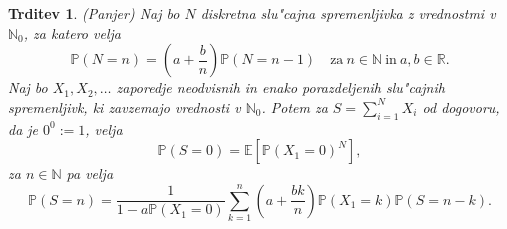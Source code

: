 \documentclass[12pt, a4paper, reqno]{amsart}
\theoremstyle{definition}
\theoremstyle{plain}
\newtheorem{trditev}[definicija]{Trditev}
\newcommand{\R}{\mathbb{R}}
\newcommand{\N}{\mathbb{N}}
\newcommand{\E}{\mathbb{E}}
\newcommand{\Prob}{\mathbb{P}}
\newcommand{\1}{\mathds{1}}
\begin{document}
    \begin{trditev}(Panjer)
        Naj bo $N$ diskretna slu"cajna spremenljivka z vrednostmi v $\N_0$, za katero velja 
        \begin{equation*}
            \Prob(N = n) = \left(a + \frac{b}{n}\right)\Prob\left(N = n-1\right) \quad \text{za} \ n\in\N \ \text{in} \ a, b \in \R.
        \end{equation*}
        Naj bo $X_1, X_2, \dots$ zaporedje neodvisnih in enako porazdeljenih slu"cajnih spremenljivk, ki 
        zavzemajo vrednosti v $\N_0$. Potem za $S = \sum_{i=1}^NX_i$ od dogovoru, da je $0^0:=1$, velja
        \begin{equation*}
        \Prob\left(S = 0\right) =  \E\left[\Prob\left(X_1 = 0\right)^N\right],
        \end{equation*}
        za $n\in\N$ pa velja
        \begin{equation}
            \Prob\left(S = n\right) = \frac{1}{1 - a\Prob\left(X_1 = 0\right)}\sum_{k = 1}^n\left(a + \frac{bk}{n}\right)\Prob\left(X_1 = k\right)\Prob\left(S = n - k\right).
            \label{eq:PanjerRecursionScheme}
        \end{equation}
        \label{tdr:PanjerRecursionScheme}
    \end{trditev}
\end{document}
